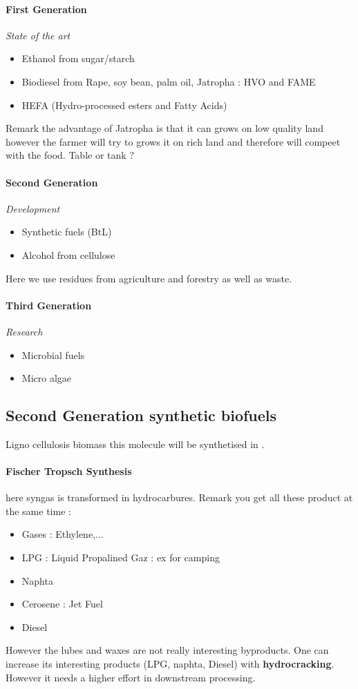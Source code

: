 \documentclass[10pt,a4paper]{article}
\begin{document}
\paragraph{First Generation} \emph{State of the art}
\begin{itemize}
\item Ethanol from sugar/starch
\item Biodiesel from Rape, soy bean, palm oil, Jatropha : HVO and FAME
\item HEFA (Hydro-processed esters and Fatty Acids)
\end{itemize}

Remark the advantage of Jatropha is that it can grows on low quality land however the farmer will try to grows it on rich land and therefore will compeet with the food. Table or tank ?

\paragraph{Second Generation} \emph{Development}
\begin{itemize}
\item Synthetic fuels (BtL)
\item Alcohol from cellulose
\end{itemize}

Here we use residues from agriculture and forestry as well as waste.

\paragraph{Third Generation} \emph{Research}
\begin{itemize}
\item Microbial fuels
\item Micro algae
\end{itemize}

\subsection{Second Generation synthetic biofuels}

Ligno cellulosis biomass  this molecule will be synthetised in .

\paragraph{Fischer Tropsch Synthesis} here syngas is transformed in hydrocarbures. Remark you get all these product at the same time :\begin{itemize}
\item Gases : Ethylene,...
\item LPG : Liquid Propalined Gaz : ex for camping
\item Naphta
\item Cerosene : Jet Fuel
\item Diesel 
\end{itemize}
However the lubes and waxes are not really interesting byproducts. One can increase its  interesting products (LPG, naphta, Diesel) with \textbf{hydrocracking}. However it needs a higher effort in downstream processing.
\end{document}
